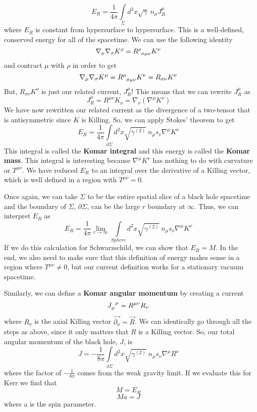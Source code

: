 \documentclass[11pt,table]{article}
\begin{document}
\begin{equation}
    E_R = \frac{1}{4\pi}\int\limits_\Sigma d^3x\sqrt{\gamma}\:n_\mu J_R^\mu
\end{equation}
where $E_R$ is constant from hypersurface to hypersurface. This is a well-defined, conserved energy for all of the spacetime.
We can use the following identity
\[\nabla_\mu\nabla_\sigma K^\rho = \tensor{R}{^\rho_{\sigma\mu\nu}}K^\nu\]
and contract $\mu$ with $\rho$ in order to get
\[\nabla_\mu\nabla_\sigma K^\mu = \tensor{R}{^\mu_{\sigma\mu\nu}}K^\nu = R_{\sigma\nu}K^\nu\]
But, $R_{\sigma\nu}K^\nu$ is just our related current, $J^\mu_R$! This means that we can rewrite $J^\mu_R$ as
\[J^\mu_R = R^{\mu\nu}K_\nu = \nabla_\nu(\nabla^\mu K^\nu)\]
We have now rewritten our related current as the divergence of a two-tensor that is antisymmetric since $K$ is Killing. So, we can apply Stokes' theorem to get
\begin{equation}
    E_R = \frac{1}{4\pi} \int\limits_{\partial\Sigma} d^2x\sqrt{\gamma^{(2)}}\:n_\mu s_\nu \nabla^\mu K^\nu
\end{equation}
This integral is called the \textbf{Komar integral} and this energy is called the \textbf{Komar mass}. This integral is interesting because $\nabla^\mu K^\nu$ has nothing to do with curvature or $T^{\mu\nu}$. We have reduced $E_R$ to an integral over the derivative of a Killing vector, which is well defined in a region with $T^{\mu\nu} = 0$.

Once again, we can take $\Sigma$ to be the entire spatial slice of a black hole spacetime and the boundary of $\Sigma$, $\partial\Sigma$, can be the large $r$ boundary at $\infty$. Thus, we can interpret $E_R$ as 
\[ E_R = \frac{1}{4\pi} \lim_{r \to \infty} \int\limits_{Sphere} d^2x\sqrt{\gamma^{(2)}}\:n_\mu s_\nu \nabla^\mu K^\nu\]
If we do this calculation for Schwarzschild, we can show that $E_R = M$. In the end, we also need to make sure that this definition of energy makes sense in a region where $T^{\mu\nu} \neq 0$, but our current definition works for a stationary vacuum spacetime.

Similarly, we can define a \textbf{Komar angular momentum} by creating a current 
\begin{equation}
    \tensor{J}{_\phi^\mu} = R^{\mu\nu}R_\nu
\end{equation}
where $R_\nu$ is the axial Killing vector $\vec{\partial_\phi} = \vec{R}$. We can identically go through all the steps as above, since it only matters that $R$ is a Killing vector. So, our total angular momentum of the black hole, $J$, is 
\begin{equation}
    J = -\frac{1}{8\pi} \int\limits_{\partial\Sigma} d^2x\sqrt{\gamma^{(2)}}\:n_\mu s_\nu \nabla^\mu R^\nu
\end{equation}
where the factor of $-\frac{1}{8\pi}$ comes from the weak gravity limit. If we evaluate this for Kerr we find that
\[ M = E_R\]
\[Ma = J\]
where a is the spin parameter.
\end{document}
